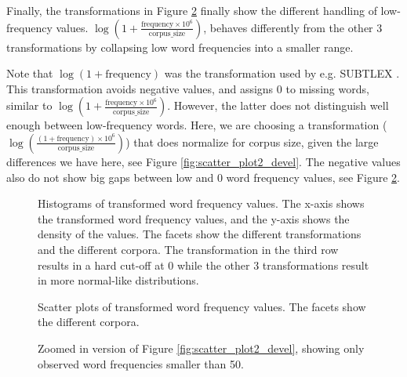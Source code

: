 \documentclass[manuscript]{stjour}
\begin{document}
Finally, the transformations in Figure \ref{fig:scatter_plot_devel} finally show the different handling of low-frequency values. $\log \left( 1 + \frac{\text{frequency} \times 10^6}{\text{corpus\_size}} \right)$, behaves differently from the other 3 transformations by collapsing low word frequencies into a smaller range. 

Note that $\log \left( 1 + \text{frequency} \right)$ was the transformation used by e.g. SUBTLEX \citep{brysbaert_word_2011}. This transformation avoids negative values, and assigns 0 to missing words, similar to $\log \left( 1 + \frac{\text{frequency} \times 10^6}{\text{corpus\_size}} \right)$. However, the latter does not distinguish well enough between low-frequency words. Here, we are choosing a transformation ($\log\left(\frac{(1 + \text{frequency}) \times 10^6}{\text{corpus\_size}}\right)$) that does normalize for corpus size, given the large differences we have here, see Figure \ref{fig:scatter_plot2_devel}. The negative values also do not show big gaps between low and 0 word frequency values, see Figure \ref{fig:scatter_plot_devel}. 

\begin{figure}[!htbp]
    \caption{ Histograms of transformed word frequency values. The x-axis shows the transformed word frequency values, and the y-axis shows the density of the values. The facets show the different transformations and the different corpora. The transformation in the third row results in a hard cut-off at 0 while the other 3 transformations result in more normal-like distributions. }
    \label{fig:histogram_plot_devel}
\end{figure}

\clearpage

\begin{figure}[!htbp]
    \begin{minipage}[t]{1\textwidth}
    \caption{ Scatter plots of transformed word frequency values. The facets show the different corpora.}
    \label{fig:scatter_plot2_devel}




    \caption{ Zoomed in version of Figure \ref{fig:scatter_plot2_devel}, showing only observed word frequencies smaller than 50.}
    \label{fig:scatter_plot_devel}
  \end{minipage}
\end{figure}
\end{document}
